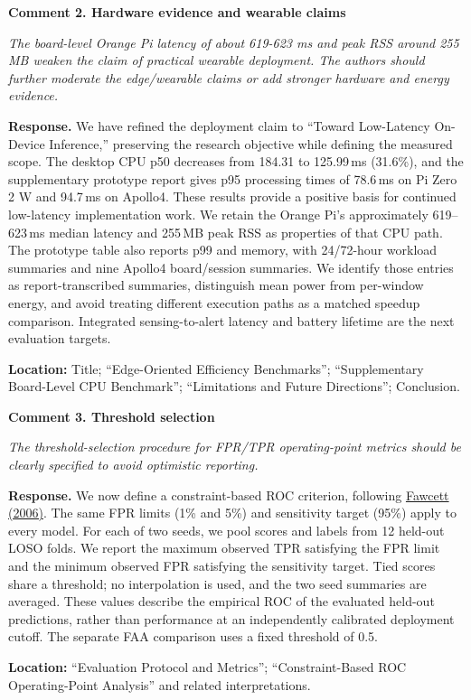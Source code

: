 \documentclass[11pt]{article}
\newcommand{\ReviewerComment}[1]{\textit{#1}\par}
\newcommand{\AuthorResponse}[1]{\textbf{Response.} #1\par}
\newcommand{\ManuscriptChange}[1]{{\small\textbf{Location:} #1}\par}
\newcommand{\commentheading}[1]{\par\medskip\textbf{#1}\par\nopagebreak[4]}
\begin{document}
\commentheading{Comment 2. Hardware evidence and wearable claims}
\ReviewerComment{The board-level Orange Pi latency of about 619-623 ms and peak RSS around 255 MB weaken the claim of practical wearable deployment. The authors should further moderate the edge/wearable claims or add stronger hardware and energy evidence.}
\AuthorResponse{We have refined the deployment claim to ``Toward Low-Latency On-Device Inference,'' preserving the research objective while defining the measured scope. The desktop CPU p50 decreases from 184.31 to 125.99\,ms (31.6\%), and the supplementary prototype report gives p95 processing times of 78.6\,ms on Pi Zero 2 W and 94.7\,ms on Apollo4. These results provide a positive basis for continued low-latency implementation work. We retain the Orange Pi's approximately 619--623\,ms median latency and 255\,MB peak RSS as properties of that CPU path. The prototype table also reports p99 and memory, with 24/72-hour workload summaries and nine Apollo4 board/session summaries. We identify those entries as report-transcribed summaries, distinguish mean power from per-window energy, and avoid treating different execution paths as a matched speedup comparison. Integrated sensing-to-alert latency and battery lifetime are the next evaluation targets.}
\ManuscriptChange{Title; ``Edge-Oriented Efficiency Benchmarks''; ``Supplementary Board-Level CPU Benchmark''; ``Limitations and Future Directions''; Conclusion.}

\commentheading{Comment 3. Threshold selection}
\ReviewerComment{The threshold-selection procedure for FPR/TPR operating-point metrics should be clearly specified to avoid optimistic reporting.}
\AuthorResponse{We now define a constraint-based ROC criterion, following \href{https://doi.org/10.1016/j.patrec.2005.10.010}{Fawcett (2006)}. The same FPR limits (1\% and 5\%) and sensitivity target (95\%) apply to every model. For each of two seeds, we pool scores and labels from 12 held-out LOSO folds. We report the maximum observed TPR satisfying the FPR limit and the minimum observed FPR satisfying the sensitivity target. Tied scores share a threshold; no interpolation is used, and the two seed summaries are averaged. These values describe the empirical ROC of the evaluated held-out predictions, rather than performance at an independently calibrated deployment cutoff. The separate FAA comparison uses a fixed threshold of 0.5.}
\ManuscriptChange{``Evaluation Protocol and Metrics''; ``Constraint-Based ROC Operating-Point Analysis'' and related interpretations.}
\end{document}
